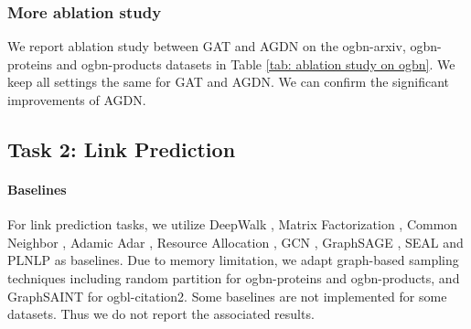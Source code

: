 \documentclass{article}
\begin{document}
\begin{table}[hbt]
    \caption{Ablation study on the ogbn-arxiv, ogbn-proteins and ogbn-products datasets. Due to the space limit, we omit the variances of these scores.}
    \label{tab: ablation study on ogbn}

\end{table}

\subsubsection{More ablation study}
We report ablation study between GAT and AGDN on the ogbn-arxiv, ogbn-proteins and ogbn-products datasets in Table \ref{tab: ablation study on ogbn}. We keep all settings the same for GAT and AGDN. We can confirm the significant improvements of AGDN.


\subsection{Task 2: Link Prediction}
\paragraph{Baselines}
For link prediction tasks, we utilize DeepWalk \cite{perozzi2014deepwalk}, Matrix Factorization \cite{menon2011link}, Common Neighbor \cite{liben2007link}, Adamic Adar \cite{adamic2003friends}, Resource Allocation \cite{zhou2009predicting}, GCN \cite{kipf2016semi}, GraphSAGE \cite{hamilton2017inductive}, SEAL \cite{zhang2021labeling} and PLNLP \cite{wang2021pairwise} as baselines. Due to memory limitation, we adapt graph-based sampling techniques including random partition \cite{li2020deepergcn, shi2020masked} for ogbn-proteins and ogbn-products, and GraphSAINT \cite{zeng2019graphsaint} for ogbl-citation2. Some baselines are not implemented for some datasets. Thus we do not report the associated results.
\end{document}

